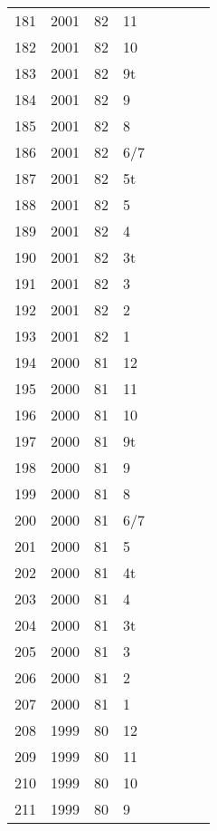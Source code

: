 \begin{longtable}{ |l|l|l|l|l|l|l|l| }
181 & 2001 & 82 &    11 &         &  &  & \\
182 & 2001 & 82 &    10 &         &  &  & \\
183 & 2001 & 82 &    9t &         &  &  & \\
184 & 2001 & 82 &     9 &         &  &  & \\
185 & 2001 & 82 &     8 &         &  &  & \\
186 & 2001 & 82 &   6/7 &         &  &  & \\
187 & 2001 & 82 &    5t &         &  &  & \\
188 & 2001 & 82 &     5 &         &  &  & \\
189 & 2001 & 82 &     4 &         &  &  & \\
190 & 2001 & 82 &    3t &         &  &  & \\
191 & 2001 & 82 &     3 &         &  &  & \\
192 & 2001 & 82 &     2 &         &  &  & \\
193 & 2001 & 82 &     1 &         &  &  & \\
194 & 2000 & 81 &    12 &         &  &  & \\
195 & 2000 & 81 &    11 &         &  &  & \\
196 & 2000 & 81 &    10 &         &  &  & \\
197 & 2000 & 81 &    9t &         &  &  & \\
198 & 2000 & 81 &     9 &         &  &  & \\
199 & 2000 & 81 &     8 &         &  &  & \\
200 & 2000 & 81 &   6/7 &         &  &  & \\
201 & 2000 & 81 &     5 &         &  &  & \\
202 & 2000 & 81 &    4t &         &  &  & \\
203 & 2000 & 81 &     4 &         &  &  & \\
204 & 2000 & 81 &    3t &         &  &  & \\
205 & 2000 & 81 &     3 &         &  &  & \\
206 & 2000 & 81 &     2 &         &    &  & \\
207 & 2000 & 81 &     1 &         &  &  & \\
208 & 1999 & 80 &    12 &         &  &  & \\
209 & 1999 & 80 &    11 &         &  &  & \\
210 & 1999 & 80 &    10 &         &  &  & \\
211 & 1999 & 80 &     9 &         &  &  & \\

\end{longtable}
